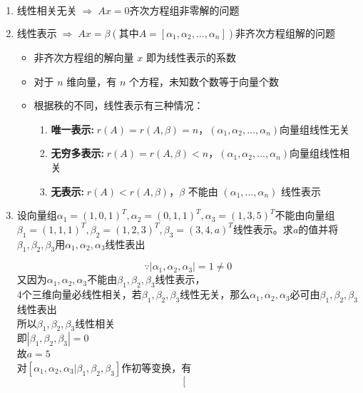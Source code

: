 \documentclass[a4paper,12pt]{article}
\begin{document}
    \begin{enumerate}
        \item $\text{线性相关无关} \;\Rightarrow\; Ax = 0\text{齐次方程组非零解的问题}$
        \item $\text{线性表示} \;\Rightarrow\; Ax = \beta(\text{其中}A = [\alpha_1, \alpha_2, \dots, \alpha_n])\text{非齐次方程组解的问题}$
        \begin{itemize}
            \item 非齐次方程组的解向量 $x$ 即为线性表示的系数
            \item 对于 $n$ 维向量，有 $n$ 个方程，未知数个数等于向量个数
            \item 根据秩的不同，线性表示有三种情况：
            \begin{enumerate}
                \item \textbf{唯一表示:}$\; r(A) = r(A,\beta) = n$，$(\alpha_1, \alpha_2, \dots, \alpha_n)$向量组线性无关
                \item \textbf{无穷多表示:}$\; r(A) = r(A,\beta) < n$，$(\alpha_1, \alpha_2, \dots, \alpha_n)$向量组线性相关
                \item \textbf{无表示:}$\; r(A) < r(A,\beta)$，$\beta$ 不能由 $(\alpha_1,\dots,\alpha_n)$ 线性表示
            \end{enumerate}
        \end{itemize}
        \item 设向量组$\alpha_1 = (1,0,1)^T, \alpha_2 = (0,1,1)^T, \alpha_3 = (1,3,5)^T$不能由向量组$\beta_1 = (1,1,1)^T, \beta_2 = (1,2,3)^T, \beta_3 = (3,4,a)^T$线性表示。求$a$的值并将$\beta_1, \beta_2, \beta_3$用$\alpha_1, \alpha_2, \alpha_3$线性表出
        \begin{analysisbox}
            \[
                \because |\alpha_1, \alpha_2, \alpha_3| = 1 \neq 0
            \]
            又因为$\alpha_1, \alpha_2, \alpha_3$不能由$\beta_1, \beta_2, \beta_3$线性表示， \\
            4个三维向量必线性相关，若$\beta_1, \beta_2, \beta_3$线性无关，那么$\alpha_1, \alpha_2, \alpha_3$必可由$\beta_1, \beta_2, \beta_3$线性表出 \\
            所以$\beta_1, \beta_2, \beta_3$线性相关 \\
            即$|\beta_1, \beta_2, \beta_3| = 0$ \\
            故$a = 5$ \\
            对$[\alpha_1, \alpha_2, \alpha_3 | \beta_1, \beta_2, \beta_3]$作初等变换，有
            \[
                \left[
                    \begin{array}{ccc|ccc}

\end{array}\]
\end{analysisbox}
\end{enumerate}
\end{document}
